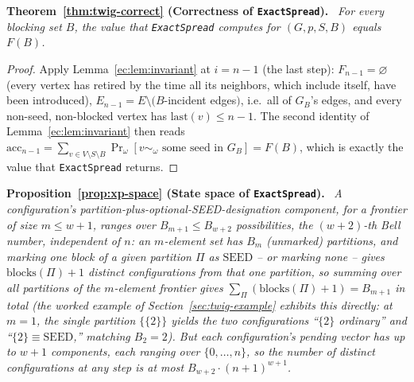 \documentclass[preprint,11pt]{elsarticle}
\theoremstyle{definition}
\theoremstyle{remark}
\newenvironment{repeattheorem}[1][]{\par\medskip\noindent\textbf{#1.}\ \itshape}{\par\medskip}
\newenvironment{repeatproposition}[1][]{\par\medskip\noindent\textbf{#1.}\ \itshape}{\par\medskip}
\newcommand{\FF}{F}
\begin{document}
\begin{repeattheorem}[Theorem~\ref{thm:twig-correct} (Correctness of \texttt{ExactSpread})]
For every blocking set $B$, the value that \texttt{ExactSpread} computes for $(G,p,S,B)$ equals $\FF(B)$.
\end{repeattheorem}
\begin{proof}
Apply Lemma~\ref{ec:lem:invariant} at $i=n-1$ (the last step): $F_{n-1}
=\varnothing$ (every vertex has retired by the time all its neighbors,
which include itself, have been introduced), $E_{n-1}=E\setminus(B$-incident
edges$)$, i.e.\ all of $G_B$'s edges, and every non-seed, non-blocked
vertex has $\mathrm{last}(v)\le n-1$. The second identity of
Lemma~\ref{ec:lem:invariant} then reads $\mathrm{acc}_{n-1}=
\sum_{v\in V\setminus S\setminus B}\Pr_\omega[v\sim_\omega\text{ some seed
in }G_B]=\FF(B)$, which is exactly the value that \texttt{ExactSpread}
returns.
\end{proof}

\begin{repeatproposition}[Proposition~\ref{prop:xp-space} (State space of \texttt{ExactSpread})]
A configuration's partition-plus-optional-SEED-designation component,
for a frontier of size $m\le w+1$, ranges over $B_{m+1}\le B_{w+2}$
possibilities, the $(w+2)$-th Bell number, independent of $n$: an
$m$-element set has $B_m$ (unmarked) partitions, and marking one block of a
given partition $\Pi$ as $\mathrm{SEED}$ -- or marking none -- gives
$\mathrm{blocks}(\Pi)+1$ distinct configurations from that one partition, so
summing over all partitions of the $m$-element frontier gives
$\sum_\Pi(\mathrm{blocks}(\Pi)+1)=B_{m+1}$ in total (the worked example of
Section~\ref{sec:twig-example} exhibits this directly: at $m=1$, the single
partition $\{\{2\}\}$ yields the two configurations ``$\{2\}$ ordinary'' and
``$\{2\}\equiv\mathrm{SEED}$,'' matching $B_2=2$). But each configuration's
pending vector has up to $w+1$ components, each ranging over
$\{0,\dots,n\}$, so the number of distinct configurations at any step is at
most $B_{w+2}\cdot(n+1)^{w+1}$.
\end{repeatproposition}
\end{document}
